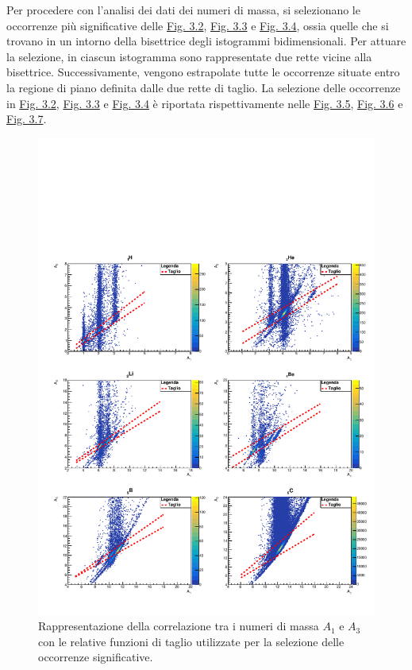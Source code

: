 \documentclass[12pt,a4paper,twoside]{report}
\begin{document}
	Per procedere con l'analisi dei dati dei numeri di massa, si selezionano le occorrenze più significative delle \hyperref[fig:a1]{Fig. 3.2}, \hyperref[fig:a2]{Fig. 3.3} e \hyperref[fig:a3]{Fig. 3.4}, ossia quelle che si trovano in un intorno della bisettrice degli istogrammi bidimensionali. Per attuare la selezione, in ciascun istogramma sono rappresentate due rette vicine alla bisettrice. Successivamente, vengono estrapolate tutte le occorrenze situate entro la regione di piano definita dalle due rette di taglio. La selezione delle occorrenze in \hyperref[fig:a1]{Fig. 3.2}, \hyperref[fig:a2]{Fig. 3.3} e \hyperref[fig:a3]{Fig. 3.4} è riportata rispettivamente nelle \hyperref[fig:a1_cut]{Fig. 3.5}, \hyperref[fig:a2_cut]{Fig. 3.6} e \hyperref[fig:a3_cut]{Fig. 3.7}.
	\begin{figure}[H]
		\centering
		\includegraphics[width=1.\linewidth]{c_MultiCanvasCut2.pdf}
		\caption{Rappresentazione della correlazione tra i numeri di massa $A_1$ e $A_3$ con le relative funzioni di taglio utilizzate per la selezione delle occorrenze significative.}
		\label{fig:a2_cut}
	\end{figure}
\end{document}

